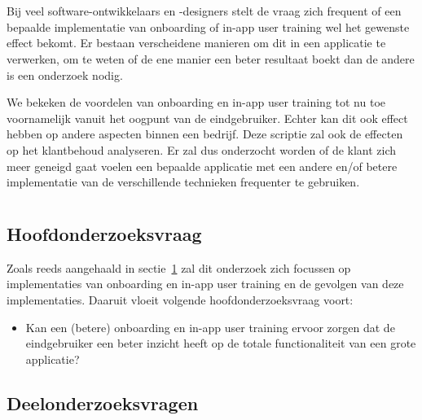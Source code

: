 \section{}
\label{sec:probleemstelling}

Bij veel software-ontwikkelaars en -designers stelt de vraag zich frequent of een bepaalde implementatie van onboarding of in-app user training wel het gewenste effect bekomt. Er bestaan verscheidene manieren om dit in een applicatie te verwerken, om te weten of de ene manier een beter resultaat boekt dan de andere is een onderzoek nodig.

We bekeken de voordelen van onboarding en in-app user training tot nu toe voornamelijk vanuit het oogpunt van de eindgebruiker. Echter kan dit ook effect hebben op andere aspecten binnen een bedrijf. Deze scriptie zal ook de effecten op het klantbehoud analyseren. Er zal dus onderzocht worden of de klant zich meer geneigd gaat voelen een bepaalde applicatie met een andere en/of betere implementatie van de verschillende technieken frequenter te gebruiken.

\section{}
\label{sec:onderzoeksvraag}

\subsection{Hoofdonderzoeksvraag}
\label{sec:hoofdonderzoeksvraag}

Zoals reeds aangehaald in sectie~\ref{sec:probleemstelling} zal dit onderzoek zich focussen op implementaties van onboarding en in-app user training en de gevolgen van deze implementaties. Daaruit vloeit volgende hoofdonderzoeksvraag voort:

\begin{itemize}
    \item Kan een (betere) onboarding en in-app user training ervoor zorgen dat de eindgebruiker een beter inzicht heeft op de totale functionaliteit van een grote applicatie?
\end{itemize}

\subsection{Deelonderzoeksvragen}
\label{sec:deelonderzoeksvragen}

